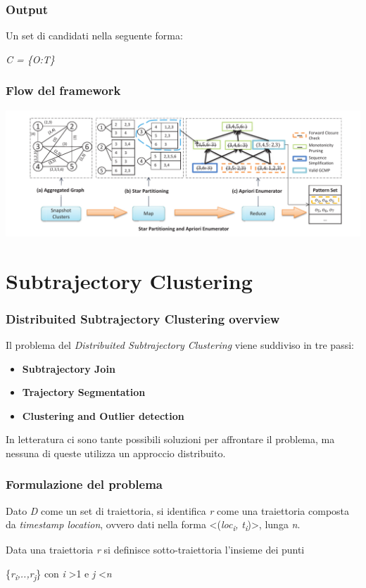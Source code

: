 \documentclass{beamer}
\begin{document}
\begin{frame}
	\frametitle{Output}
	Un set di candidati nella seguente forma: 
	
	\begin{center}
		\huge  \textit{C = \{O:T\}} 
	\end{center}




	
	
\end{frame}

\begin{frame}
	\frametitle{Flow del framework}

\includegraphics[scale=0.25]{GCMP-flow}
	
\end{frame}




\section{Subtrajectory Clustering}

\begin{frame}
	\frametitle{Distribuited Subtrajectory Clustering overview}
	
	Il problema del \textit{Distribuited Subtrajectory Clustering} viene suddiviso in tre passi:
	
	\begin{itemize}
		\item \textbf{Subtrajectory Join}
		\item \textbf{Trajectory Segmentation}
		\item \textbf{Clustering and Outlier detection}
	\end{itemize}

In letteratura ci sono tante possibili soluzioni per affrontare il problema, ma nessuna di queste utilizza un approccio distribuito.
\end{frame}

\begin{frame}
	\frametitle{Formulazione del problema}
	Dato \textit{D} come un set di traiettoria, si identifica \textit{r} come una traiettoria composta da \textit{timestamp location}, ovvero dati nella forma \textless (\textit{loc\textsubscript{i}, t\textsubscript{i}})\textgreater, lunga \textit{n}.
	
	Data una traiettoria \textit{r} si definisce sotto-traiettoria l'insieme dei punti 
	
	\{\textit{r\textsubscript{i},..,r\textsubscript{j}}\} con \textit{i} \textgreater 1 e \textit{j} \textless \textit{n}
\end{frame}
\end{document}

